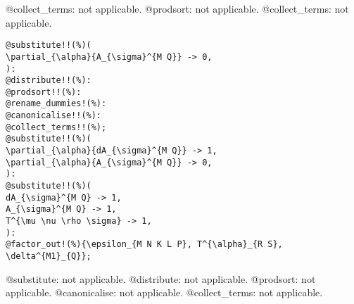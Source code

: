 \documentclass[11pt]{article}
\begin{document}
\begin{dmath*}[compact, spread=2pt]
\end{dmath*}
@collect\_terms: not applicable.
@prodsort: not applicable.
@collect\_terms: not applicable.
{\color[named]{Blue}\begin{verbatim}
@substitute!!(%)(
\partial_{\alpha}{A_{\sigma}^{M Q}} -> 0,
):
@distribute!!(%):
@prodsort!!(%):
@rename_dummies!(%):
@canonicalise!!(%):
@collect_terms!!(%);
@substitute!!(%)(
\partial_{\alpha}{dA_{\sigma}^{M Q}} -> 1,
\partial_{\alpha}{A_{\sigma}^{M Q}} -> 0,
):
@substitute!!(%)(
dA_{\sigma}^{M Q} -> 1,
A_{\sigma}^{M Q} -> 1,
T^{\mu \nu \rho \sigma} -> 1,
):
@factor_out!(%){\epsilon_{M N K L P}, T^{\alpha}_{R S}, \delta^{M1}_{Q}};
\end{verbatim}}
@substitute: not applicable.
@distribute: not applicable.
@prodsort: not applicable.
@canonicalise: not applicable.
@collect\_terms: not applicable.
\end{document}
